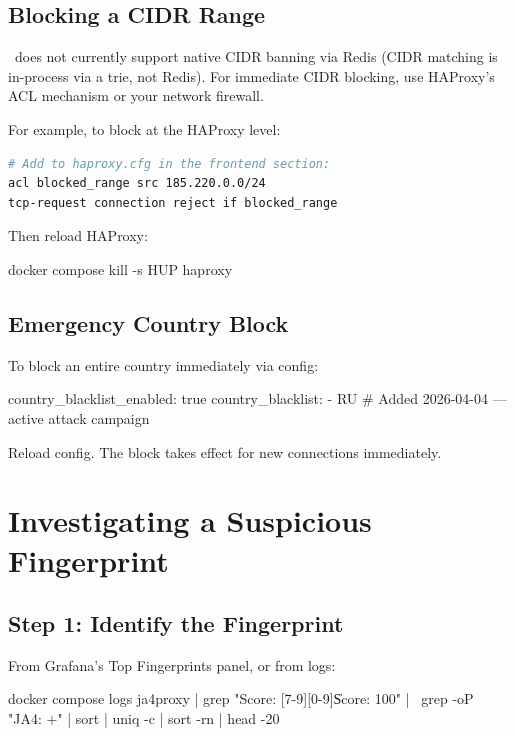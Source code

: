 \subsection{Blocking a CIDR Range}

\ja\ does not currently support native CIDR banning via Redis (CIDR matching
is in-process via a trie, not Redis). For immediate CIDR blocking, use HAProxy's
ACL mechanism or your network firewall.

For example, to block  at the HAProxy level:
\begin{lstlisting}[language=bash, numbers=none]
# Add to haproxy.cfg in the frontend section:
acl blocked_range src 185.220.0.0/24
tcp-request connection reject if blocked_range
\end{lstlisting}

Then reload HAProxy:
\begin{bashcode}
docker compose kill -s HUP haproxy
\end{bashcode}

\subsection{Emergency Country Block}

To block an entire country immediately via config:

\begin{yamlcode}
country_blacklist_enabled: true
country_blacklist:
  - RU   # Added 2026-04-04 — active attack campaign
\end{yamlcode}

Reload config. The block takes effect for new connections immediately.

\section{Investigating a Suspicious Fingerprint}

\subsection{Step 1: Identify the Fingerprint}

From Grafana's Top Fingerprints panel, or from logs:

\begin{bashcode}
docker compose logs ja4proxy | grep "Score: [7-9][0-9]\|Score: 100" | \
  grep -oP "JA4: \K[^ |]+" | sort | uniq -c | sort -rn | head -20
\end{bashcode}

